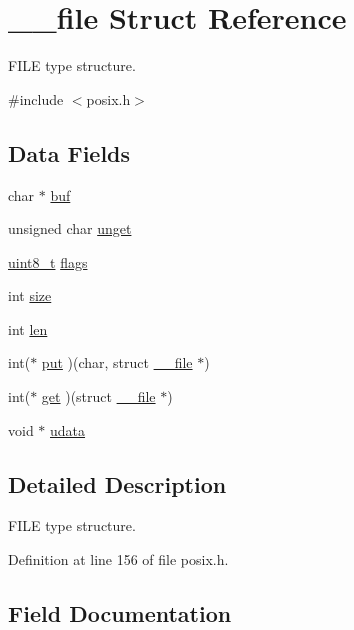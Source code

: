 \hypertarget{struct____file}{}\section{\+\_\+\+\_\+file Struct Reference}
\label{struct____file}


F\+I\+LE type structure.  




{\ttfamily \#include $<$posix.\+h$>$}

\subsection*{Data Fields}
\begin{DoxyCompactItemize}
\item 
char $\ast$ \hyperlink{struct____file_a3e5a85ae919a90efbb7cb44ccb54fe46}{buf}
\item 
unsigned char \hyperlink{struct____file_a1d139ae3cb11a1fada469a49f7d3d3b6}{unget}
\item 
\hyperlink{send_8c_aba7bc1797add20fe3efdf37ced1182c5}{uint8\+\_\+t} \hyperlink{struct____file_a8d11df8679502efee09740f97d7c277b}{flags}
\item 
int \hyperlink{struct____file_aff4a1ca8b6a12460812928afae81248d}{size}
\item 
int \hyperlink{struct____file_a30309efd13a75ed510bb2370debafaf8}{len}
\item 
int($\ast$ \hyperlink{struct____file_a01c8b217e42cc11b6a7f8429114e9d46}{put} )(char, struct \hyperlink{struct____file}{\+\_\+\+\_\+file} $\ast$)
\item 
int($\ast$ \hyperlink{struct____file_a2d816b077c3af0425344fe4b283dad33}{get} )(struct \hyperlink{struct____file}{\+\_\+\+\_\+file} $\ast$)
\item 
void $\ast$ \hyperlink{struct____file_abe6f3bdb4df4119277132eb3e13a4628}{udata}
\end{DoxyCompactItemize}


\subsection{Detailed Description}
F\+I\+LE type structure. 

Definition at line 156 of file posix.\+h.



\subsection{Field Documentation}
